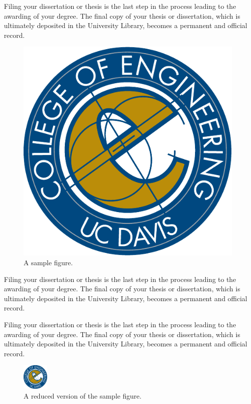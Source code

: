 Filing your dissertation or thesis is the last step in the process leading to the awarding of your degree. The final copy of your thesis or dissertation, which is ultimately deposited in the University Library, becomes a permanent and official record.
%
\begin{figure}[tbh]
\centering
\includegraphics{ucdavisthesis_example_figure}
\caption[First sample figure]{A sample figure.}
\label{fig.sample_1}
\end{figure}

Filing your dissertation or thesis is the last step in the process leading to the awarding of your degree. The final copy of your thesis or dissertation, which is ultimately deposited in the University Library, becomes a permanent and official record.

Filing your dissertation or thesis is the last step in the process leading to the awarding of your degree. The final copy of your thesis or dissertation, which is ultimately deposited in the University Library, becomes a permanent and official record.
%
\begin{figure}[tbh]
\centering
\includegraphics[width=0.5in]{ucdavisthesis_example_figure}
\caption[Second sample figure]{A reduced version of the sample figure.}
\label{fig.sample_2}
\end{figure}


